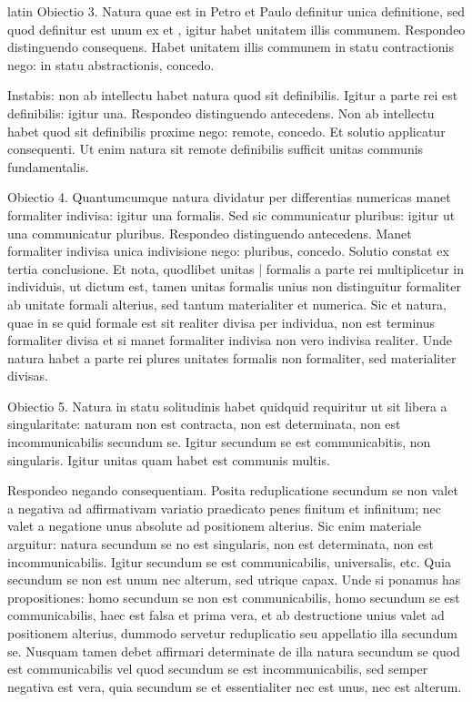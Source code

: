 \begin{otherlanguage*}{latin}
\pstart
Obiectio 3. Natura quae est in Petro et Paulo definitur unica definitione, sed quod definitur est unum ex  et , igitur habet unitatem illis communem. Respondeo distinguendo consequens. Habet unitatem illis communem in statu contractionis nego:
in statu abstractionis, concedo. 
\pend

\pstart
Instabis:
non ab intellectu habet natura quod sit definibilis. Igitur a parte rei est definibilis:
igitur una. Respondeo distinguendo antecedens. Non ab intellectu habet quod sit definibilis proxime nego:
remote, concedo. Et solutio applicatur consequenti. Ut enim natura sit remote definibilis sufficit unitas communis fundamentalis. 
\pend

\pstart
Obiectio 4. Quantumcumque natura dividatur per differentias numericas manet formaliter indivisa:
igitur una formalis. Sed sic communicatur pluribus:
igitur ut una communicatur pluribus. Respondeo distinguendo antecedens. Manet formaliter indivisa unica indivisione nego:
pluribus, concedo. Solutio constat ex tertia conclusione. Et nota, quodlibet unitas \textnormal{|} formalis a parte rei multiplicetur in individuis, ut dictum est, tamen unitas formalis unius non distinguitur formaliter ab unitate formali alterius, sed tantum materialiter et numerica. Sic et natura, quae in se quid formale est sit realiter divisa per individua, non est terminus formaliter divisa et si manet formaliter indivisa non vero indivisa realiter. Unde natura habet a parte rei plures unitates formalis non formaliter, sed materialiter divisas. 
\pend

\pstart
Obiectio 5. Natura in statu solitudinis habet quidquid requiritur ut sit libera a singularitate:
naturam non est contracta, non est determinata, non est incommunicabilis secundum se. Igitur secundum se est communicabitis, non singularis. Igitur unitas quam habet est communis multis. 
\pend

\pstart
Respondeo negando consequentiam. Posita reduplicatione secundum se non valet a negativa ad affirmativam variatio praedicato penes finitum et infinitum; nec valet a negatione unus absolute ad positionem alterius. Sic enim materiale arguitur:
natura secundum se no est singularis, non est determinata, non est incommunicabilis. Igitur secundum se est communicabilis, universalis, etc. Quia secundum se non est unum nec alterum, sed utrique capax. Unde si ponamus has propositiones:
homo secundum se non est communicabilis, homo secundum se est communicabilis, haec est falsa et prima vera, et ab destructione unius valet ad positionem alterius, dummodo servetur reduplicatio seu appellatio illa secundum se. Nusquam tamen debet affirmari determinate de illa natura secundum se quod est communicabilis vel quod secundum se est incommunicabilis, sed semper negativa est vera, quia secundum se et essentialiter nec est unus, nec est alterum. 
\pend


\end{otherlanguage*}
